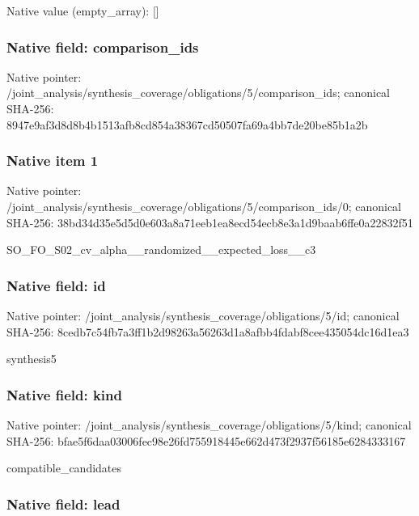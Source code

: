 \documentclass[10pt,a4paper]{article}
\begin{document}
Native value (empty\_array): []



\subsubsection{Native field: comparison\_ids}


Native pointer: /joint\_analysis/synthesi\allowbreak{}s\_coverage/obligations/5\allowbreak{}/comparison\_ids; canonical SHA-256: 8947e9af3d8d8b4b1513afb8\allowbreak{}cd854a38367cd50507fa69a4\allowbreak{}bb7de20be85b1a2b



\subsubsection{Native item 1}


Native pointer: /joint\_analysis/synthesi\allowbreak{}s\_coverage/obligations/5\allowbreak{}/comparison\_ids/0; canonical SHA-256: 38bd34d35e5d5d0e603a8a71\allowbreak{}eeb1ea8ecd54ecb8e3a1d9ba\allowbreak{}ab6ffe0a22832f51


SO\_FO\_S02\_cv\_alpha\_\_rand\allowbreak{}omized\_\_expected\_loss\_\_c\allowbreak{}3


\subsubsection{Native field: id}


Native pointer: /joint\_analysis/synthesi\allowbreak{}s\_coverage/obligations/5\allowbreak{}/id; canonical SHA-256: 8cedb7c54fb7a3ff1b2d9826\allowbreak{}3a56263d1a8afbb4fdabf8ce\allowbreak{}e435054dc16d1ea3


synthesis5


\subsubsection{Native field: kind}


Native pointer: /joint\_analysis/synthesi\allowbreak{}s\_coverage/obligations/5\allowbreak{}/kind; canonical SHA-256: bfae5f6daa03006fec98e26f\allowbreak{}d755918445e662d473f2937f\allowbreak{}56185e6284333167


compatible\_candidates


\subsubsection{Native field: lead}
\end{document}
